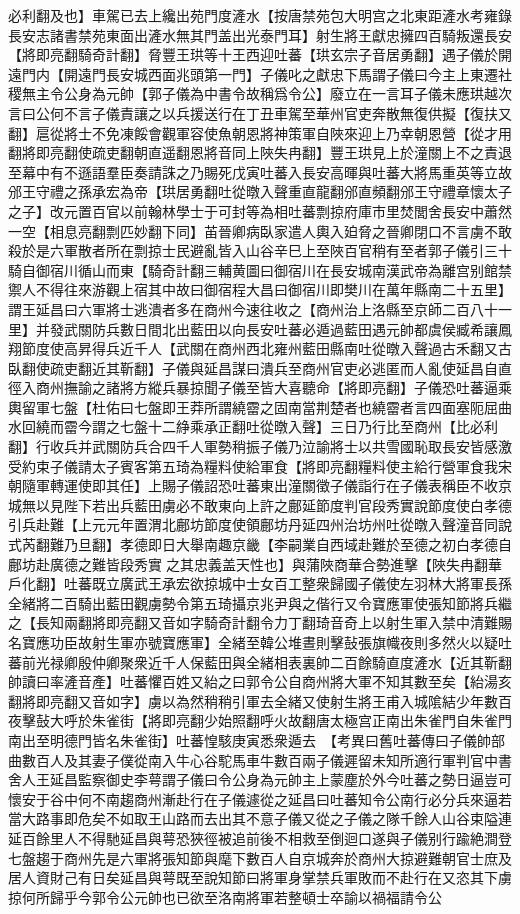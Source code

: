 必利翻及也】車駕已去上纔出苑門度滻水【按唐禁苑包大明宫之北東距滻水考雍錄長安志諸書禁苑東面出滻水無其門盖出光泰門耳】射生將王獻忠擁四百騎叛還長安【將即亮翻騎奇計翻】脅豐王珙等十王西迎吐蕃【珙玄宗子音居勇翻】遇子儀於開遠門内【開遠門長安城西面兆頭第一門】子儀叱之獻忠下馬謂子儀曰今主上東遷社稷無主令公身為元帥【郭子儀為中書令故稱爲令公】廢立在一言耳子儀未應珙越次言曰公何不言子儀責讓之以兵援送行在丁丑車駕至華州官吏奔散無復供擬【復扶又翻】扈從將士不免凍餒會觀軍容使魚朝恩將神策軍自陜來迎上乃幸朝恩營【從才用翻將即亮翻使疏吏翻朝直遥翻恩將音同上陜失冉翻】豐王珙見上於潼關上不之責退至幕中有不遜語羣臣奏請誅之乃賜死戊寅吐蕃入長安高暉與吐蕃大將馬重英等立故邠王守禮之孫承宏為帝【珙居勇翻吐從暾入聲重直龍翻邠直頻翻邠王守禮章懷太子之子】改元置百官以前翰林學士于可封等為相吐蕃剽掠府庫市里焚閭舍長安中蕭然一空【相息亮翻剽匹妙翻下同】苖晉卿病臥家遣人輿入廹脅之晉卿閉口不言虜不敢殺於是六軍散者所在剽掠士民避亂皆入山谷辛巳上至陜百官稍有至者郭子儀引三十騎自御宿川循山而東【騎奇計翻三輔黄圖曰御宿川在長安城南漢武帝為離宫别館禁禦人不得往來游觀上宿其中故曰御宿程大昌曰御宿川即樊川在萬年縣南二十五里】謂王延昌曰六軍將士逃潰者多在商州今速往收之【商州治上洛縣至京師二百八十一里】并發武關防兵數日間北出藍田以向長安吐蕃必遁過藍田遇元帥都虞侯臧希讓鳳翔節度使高昇得兵近千人【武關在商州西北雍州藍田縣南吐從暾入聲過古禾翻又古臥翻使疏吏翻近其靳翻】子儀與延昌謀曰潰兵至商州官吏必逃匿而人亂使延昌自直徑入商州撫諭之諸將方縱兵暴掠聞子儀至皆大喜聽命【將即亮翻】子儀恐吐蕃逼乘輿留軍七盤【杜佑曰七盤即王莽所謂繞霤之固南當荆楚者也繞霤者言四面塞阨屈曲水回繞而霤今謂之七盤十二䋫乘承正翻吐從暾入聲】三日乃行比至商州【比必利翻】行收兵并武關防兵合四千人軍勢稍振子儀乃泣諭將士以共雪國恥取長安皆感激受約束子儀請太子賓客第五琦為糧料使給軍食【將即亮翻糧料使主給行營軍食我宋朝隨軍轉運使即其任】上賜子儀詔恐吐蕃東出潼關徵子儀詣行在子儀表稱臣不收京城無以見陛下若出兵藍田虜必不敢東向上許之鄜延節度判官段秀實說節度使白孝德引兵赴難【上元元年置渭北鄜坊節度使領鄜坊丹延四州治坊州吐從暾入聲潼音同說式芮翻難乃旦翻】孝德即日大舉南趣京畿【李嗣業自西域赴難於至德之初白孝德自鄜坊赴廣德之難皆段秀實之其忠義盖天性也】與蒲陜商華合勢進擊【陜失冉翻華戶化翻】吐蕃既立廣武王承宏欲掠城中士女百工整衆歸國子儀使左羽林大將軍長孫全緒將二百騎出藍田觀虜勢令第五琦攝京兆尹與之偕行又令寶應軍使張知節將兵繼之【長知兩翻將即亮翻又音如字騎奇計翻令力丁翻琦音奇上以射生軍入禁中清難賜名寶應功臣故射生軍亦號寶應軍】全緒至韓公堆晝則擊鼔張旗幟夜則多然火以疑吐蕃前光禄卿殷仲卿聚衆近千人保藍田與全緒相表裏帥二百餘騎直度滻水【近其靳翻帥讀曰率滻音產】吐蕃懼百姓又紿之曰郭令公自商州將大軍不知其數至矣【紿湯亥翻將即亮翻又音如字】虜以為然稍稍引軍去全緒又使射生將王甫入城隂結少年數百夜擊鼔大呼於朱雀街【將即亮翻少始照翻呼火故翻唐太極宫正南出朱雀門自朱雀門南出至明德門皆名朱雀街】吐蕃惶駭庚寅悉衆遁去　【考異曰舊吐蕃傳曰子儀帥部曲數百人及其妻子僕從南入牛心谷駝馬車牛數百兩子儀遲留未知所適行軍判官中書舍人王延昌監察御史李萼謂子儀曰令公身為元帥主上蒙塵於外今吐蕃之勢日逼豈可懷安于谷中何不南趨商州漸赴行在子儀遽從之延昌曰吐蕃知令公南行必分兵來逼若當大路事即危矣不如取王山路而去出其不意子儀又從之子儀之隊千餘人山谷束隘連延百餘里人不得馳延昌與萼恐狹徑被追前後不相救至倒迴口遂與子儀别行踰絶澗登七盤趨于商州先是六軍將張知節與麾下數百人自京城奔於商州大掠避難朝官士庶及居人資財己有日矣延昌與萼既至說知節曰將軍身掌禁兵軍敗而不赴行在又恣其下虜掠何所歸乎今郭令公元帥也已欲至洛南將軍若整頓士卒諭以禍福請令公